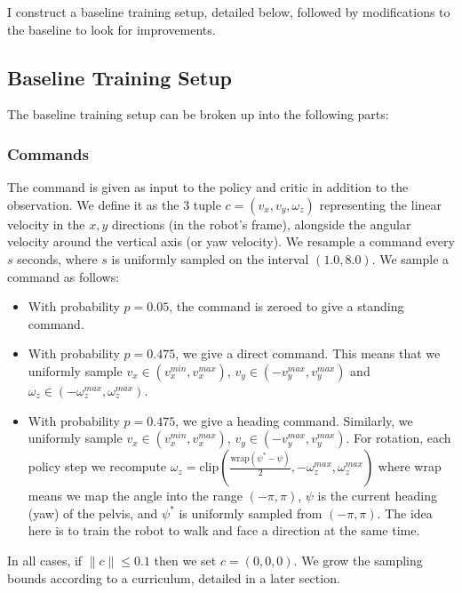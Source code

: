 \documentclass[11pt]{article}
\begin{document}
I construct a baseline training setup, detailed below, followed by modifications to the baseline to look for improvements.

\subsection{Baseline Training Setup}
The baseline training setup can be broken up into the following parts:
\subsubsection*{Commands}
The command is given as input to the policy and critic in addition to the observation. We define it as the 3 tuple $c = (v_x, v_y, \omega_z)$ representing the linear velocity in the $x,y$ directions (in the robot's frame), alongside the angular velocity around the vertical axis (or yaw velocity). We resample a command every $s$ seconds, where $s$ is uniformly sampled on the interval $(1.0, 8.0)$. We sample a command as follows:
\begin{itemize}
    \item With probability $p=0.05$, the command is zeroed to give a standing command.
    \item With probability $p=0.475$, we give a direct command. This means that we uniformly sample $v_x \in (v_x^{min}, v_x^{max})$, $v_y \in (-v_y^{max}, v_y^{max})$ and $\omega_z \in (-\omega_z^{max}, \omega_z^{max})$.
        \item With probability $p=0.475$, we give a heading command. Similarly, we uniformly sample $v_x \in (v_x^{min}, v_x^{max})$, $v_y \in (-v_y^{max}, v_y^{max})$. For rotation, each policy step we recompute $\omega_z = \text{clip}(\frac{\text{wrap}(\psi^* - \psi)}{2}, -\omega_z^{max}, \omega_z^{max})$ where wrap means we map the angle into the range $(-\pi, \pi)$, $\psi$ is the current heading (yaw) of the pelvis, and $\psi^*$ is uniformly sampled from $(-\pi, \pi)$. The idea here is to train the robot to walk and face a direction at the same time.
\end{itemize}
In all cases, if $\|c\| \leq 0.1$ then we set $c = (0, 0, 0)$. We grow the sampling bounds according to a curriculum, detailed in a later section.
\end{document}
